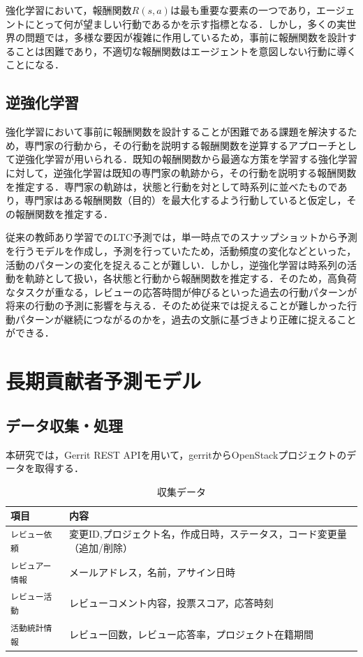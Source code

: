 \documentclass[submit,techrep,noauthor]{ipsj}
\begin{document}
強化学習において，報酬関数$R(s, a)$は最も重要な要素の一つであり，エージェントにとって何が望ましい行動であるかを示す指標となる．しかし，多くの実世界の問題では，多様な要因が複雑に作用しているため，事前に報酬関数を設計することは困難であり，不適切な報酬関数はエージェントを意図しない行動に導くことになる．
\subsection{逆強化学習}
強化学習において事前に報酬関数を設計することが困難である課題を解決するため，専門家の行動から，その行動を説明する報酬関数を逆算するアプローチとして逆強化学習が用いられる\cite{IRL}．既知の報酬関数から最適な方策を学習する強化学習に対して，逆強化学習は既知の専門家の軌跡から，その行動を説明する報酬関数を推定する．専門家の軌跡は，状態と行動を対として時系列に並べたものであり，専門家はある報酬関数（目的）を最大化するよう行動していると仮定し，その報酬関数を推定する．

従来の教師あり学習でのLTC予測では，単一時点でのスナップショットから予測を行うモデルを作成し，予測を行っていたため，活動頻度の変化などといった，活動のパターンの変化を捉えることが難しい．しかし，逆強化学習は時系列の活動を軌跡として扱い，各状態と行動から報酬関数を推定する．そのため，高負荷なタスクが重なる，レビューの応答時間が伸びるといった過去の行動パターンが将来の行動の予測に影響を与える．そのため従来では捉えることが難しかった行動パターンが継続につながるのかを，過去の文脈に基づきより正確に捉えることができる．


\section{長期貢献者予測モデル}
\label{sec:model}
\subsection{データ収集・処理}
本研究では，Gerrit REST APIを用いて，gerritからOpenStackプロジェクトのデータを取得する．

\begin{table}[h]
    \centering
    \label{table:dataList}
    \caption{収集データ}
    \begin{tabularx}{\columnwidth}{@{}lX@{}} 
        \toprule
        \textbf{項目} & \textbf{内容} \\
        \midrule
        \texttt{レビュー依頼} & 変更ID,プロジェクト名，作成日時，ステータス，コード変更量（追加/削除）\\ 
        \texttt{レビュアー情報} & メールアドレス，名前，アサイン日時 \\
        \texttt{レビュー活動} & レビューコメント内容，投票スコア，応答時刻 \\
        \texttt{活動統計情報} & レビュー回数，レビュー応答率，プロジェクト在籍期間 \\
        \bottomrule
    \end{tabularx}
\end{table}
\end{document}
